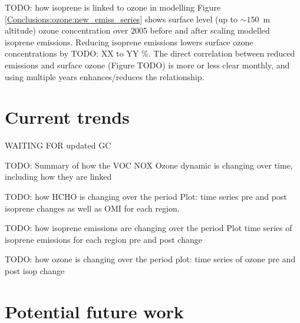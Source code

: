   TODO: how isoprene is linked to ozone in modelling 
  Figure \ref{Conclusions:ozone:new_emiss_series} shows surface level (up to $\sim 150$~m altitude) ozone concentration over 2005 before and after scaling modelled isoprene emissions.
  Reducing isoprene emissions lowers surface ozone concentrations by TODO: XX to YY \%.
  The direct correlation between reduced emissions and surface ozone (Figure TODO) is more or less clear monthly, and using multiple years enhances/reduces the relationship.
  
  
\section{Current trends}
\label{Conclusions:trends}
  
  WAITING FOR updated GC
  
  TODO: Summary of how the VOC NOX Ozone dynamic is changing over time, including how they are linked
  
  TODO: how HCHO is changing over the period
  Plot: time series pre and post isoprene changes as well as OMI for each region.

  TODO: how isoprene emissions are changing over the period
  Plot time series of isoprene emissions for each region pre and post change
  
  
  TODO: how ozone is changing over the period
  plot: time series of ozone pre and post isop change
  
\section{Potential future work}
\label{Conclusions:future}
  
